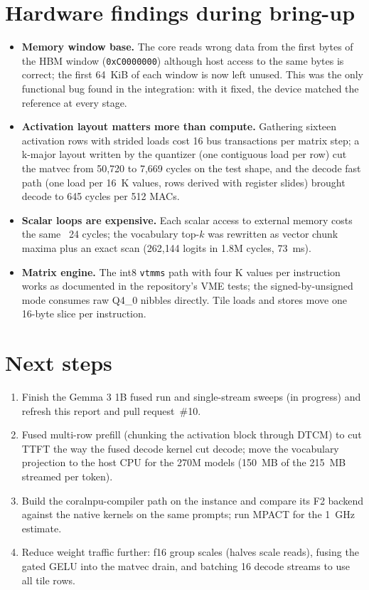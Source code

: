 \documentclass[11pt]{article}
\begin{document}
\section{Hardware findings during bring-up}
\begin{itemize}
  \item \textbf{Memory window base.} The core reads wrong data from the first bytes of the HBM
    window (\texttt{0xC0000000}) although host access to the same bytes is correct; the first
    64~KiB of each window is now left unused. This was the only functional bug found in the
    integration: with it fixed, the device matched the reference at every stage.
  \item \textbf{Activation layout matters more than compute.} Gathering sixteen activation rows
    with strided loads cost 16 bus transactions per matrix step; a k-major layout written by the
    quantizer (one contiguous load per row) cut the matvec from 50{,}720 to 7{,}669 cycles on the
    test shape, and the decode fast path (one load per 16~K values, rows derived with register
    slides) brought decode to 645 cycles per 512 MACs.
  \item \textbf{Scalar loops are expensive.} Each scalar access to external memory costs the same
    ~24 cycles; the vocabulary top-$k$ was rewritten as vector chunk maxima plus an exact scan
    (262{,}144 logits in 1.8M cycles, 73~ms).
  \item \textbf{Matrix engine.} The int8 \texttt{vtmms} path with four K values per instruction
    works as documented in the repository's VME tests; the signed-by-unsigned mode consumes raw
    Q4\_0 nibbles directly. Tile loads and stores move one 16-byte slice per instruction.
\end{itemize}

\section{Next steps}
\begin{enumerate}
  \item Finish the Gemma 3 1B fused run and single-stream sweeps (in progress) and refresh this
    report and pull request~\#10.
  \item Fused multi-row prefill (chunking the activation block through DTCM) to cut TTFT the
    way the fused decode kernel cut decode; move the vocabulary projection to the host CPU for the
    270M models (150~MB of the 215~MB streamed per token).
  \item Build the coralnpu-compiler path on the instance and compare its F2 backend against the
    native kernels on the same prompts; run MPACT for the 1~GHz estimate.
  \item Reduce weight traffic further: f16 group scales (halves scale reads), fusing the gated
    GELU into the matvec drain, and batching 16 decode streams to use all tile rows.
\end{enumerate}
\end{document}
